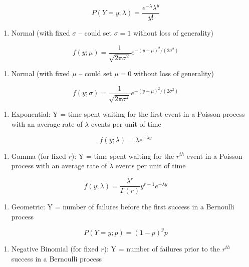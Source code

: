 \documentclass[
]{krantz}
\providecommand{\tightlist}{%
  \setlength{\itemsep}{0pt}\setlength{\parskip}{0pt}}
\begin{document}
\[
  P(Y=y; \lambda)=\frac{e^{-\lambda}\lambda^y}{y!}
  \]

\begin{enumerate}
\def\labelenumi{\alph{enumi})}
\setcounter{enumi}{3}
\tightlist
\item
  Normal (with fixed \(\sigma\) -- could set \(\sigma=1\) without loss of generality)
\end{enumerate}

\[f(y; \mu)=\frac{1}{\sqrt{2\pi\sigma^2}}e^{-{(y-\mu)^2}/{(2\sigma^2)}}\]

\begin{enumerate}
\def\labelenumi{\alph{enumi})}
\setcounter{enumi}{4}
\tightlist
\item
  Normal (with fixed \(\mu\) -- could set \(\mu=0\) without loss of generality)
\end{enumerate}

\[f(y; \sigma)=\frac{1}{\sqrt{2\pi\sigma^2}}e^{-{(y-\mu)^2}/{(2\sigma^2)}}\]

\begin{enumerate}
\def\labelenumi{\alph{enumi})}
\setcounter{enumi}{5}
\tightlist
\item
  Exponential: Y = time spent waiting for the first event in a Poisson process with an average rate of \(\lambda\) events per unit of time
\end{enumerate}

\[f(y; \lambda)=\lambda e^{-\lambda y}\]

\begin{enumerate}
\def\labelenumi{\alph{enumi})}
\setcounter{enumi}{6}
\tightlist
\item
  Gamma (for fixed \(r\)): Y = time spent waiting for the \(r^{th}\) event in a Poisson process with an average rate of \(\lambda\) events per unit of time
\end{enumerate}

\[f(y; \lambda) = \frac{\lambda^r}{\Gamma(r)} y^{r-1} e^{-\lambda y}\]

\begin{enumerate}
\def\labelenumi{\alph{enumi})}
\setcounter{enumi}{7}
\tightlist
\item
  Geometric: Y = number of failures before the first success in a Bernoulli process
\end{enumerate}

\[P(Y=y;p)=(1-p)^{y}p\]

\begin{enumerate}
\def\labelenumi{\roman{enumi})}
\tightlist
\item
  Negative Binomial (for fixed \(r\)): Y = number of failures prior to the \(r^{th}\) success in a Bernoulli process
\end{enumerate}
\end{document}
